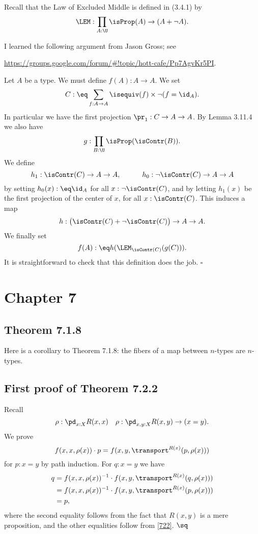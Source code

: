 \documentclass[12pt]{article}
\begin{document}
Recall that the Law of Excluded Middle is defined in (3.4.1) by 
$$
\LEM:\prod_{A:\U}\isProp(A)\to(A+\neg A).
$$ 

I learned the following argument from Jason Gross; see 

\nn\href{https://groups.google.com/forum/#!topic/hott-cafe/Pp7AgvKr5PI}{https://groups.google.com/forum/\#!topic/hott-cafe/Pp7AgvKr5PI}.

Let $A$ be a type. We must define $f(A):A\to A$. We set 
$$
C:\eq\sum_{f:A\to A}\isequiv(f)\times\neg(f=\id_A).
$$ 
In particular we have the first projection $\pr_1:C\to A\to A$. By Lemma 3.11.4 we also have 
$$
g:\prod_{B:\U}\isProp(\isContr(B)).
$$ 
We define 
$$
h_1:\isContr(C)\to A\to A,\qquad\quad h_0:\neg\isContr(C)\to A\to A
$$ 
by setting $h_0(x):\eq\id_A$ for all $x:\neg\isContr(C)$, and by letting $h_1(x)$ be the first projection of the center of $x$, for all $x:\isContr(C)$. This induces a map 
$$
h:\big(\isContr(C)+\neg\isContr(C)\big)\to A\to A.
$$ 
We finally set 
$$
f(A):\eq h(\LEM_{\isContr(C)}(g(C))).
$$
It is straightforward to check that this definition does the job. $\square$


\section{Chapter 7}

\subsection{Theorem 7.1.8}\label{718}

Here is a corollary to Theorem 7.1.8: the fibers of a map between $n$-types are $n$-types.


\subsection{First proof of Theorem 7.2.2}

Recall 
$$
\rho:\pd_{x:X}R(x,x)\quad\rho:\pd_{x,y:X}R(x,y)\to(x=y).
$$ 
We prove 
\begin{equation}\label{722}
f(x,x,\rho(x))\cdot p=f(x,y,\transport^{R(x)}(p,\rho(x)))
\end{equation}  
for $p:x=y$ by path induction. For $q:x=y$ we have 
\begin{align*}
q&=f(x,x,\rho(x))^{-1}\cdot f(x,y,\transport^{R(x)}(q,\rho(x)))\\
&=f(x,x,\rho(x))^{-1}\cdot f(x,y,\transport^{R(x)}(p,\rho(x)))\\
&=p,
\end{align*} 
where the second equality follows from the fact that $R(x,y)$ is a mere proposition, and the other equalities follow from \eqref{722}. $\sq$
\end{document}
